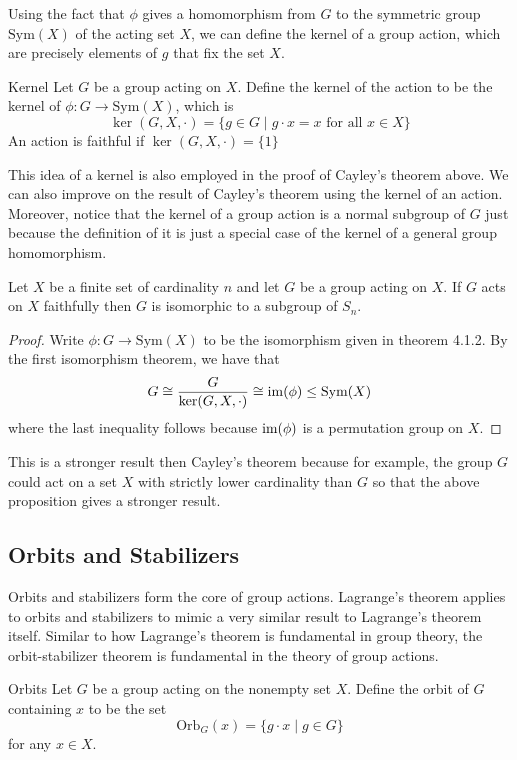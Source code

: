 \documentclass[a4paper]{article}
\begin{document}
Using the fact that $\phi$ gives a homomorphism from $G$ to the symmetric group $\text{Sym}(X)$ of the acting set $X$, we can define the kernel of a group action, which are precisely elements of $g$ that fix the set $X$. 

\begin{defn}{Kernel}{} Let $G$ be a group acting on $X$. Define the kernel of the action to be the kernel of $\phi:G\to\text{Sym}(X)$, which is $$\ker(G,X,\cdot)=\{g\in G\;|\;g\cdot x=x\text{ for all }x\in X\}$$ An action is faithful if $\ker(G,X,\cdot)=\{1\}$
\end{defn}

This idea of a kernel is also employed in the proof of Cayley's theorem above. We can also improve on the result of Cayley's theorem using the kernel of an action. Moreover, notice that the kernel of a group action is a normal subgroup of $G$ just because the definition of it is just a special case of the kernel of a general group homomorphism. 

\begin{prp}{}{} Let $X$ be a finite set of cardinality $n$ and let $G$ be a group acting on $X$. If $G$ acts on $X$ faithfully then $G$ is isomorphic to a subgroup of $S_n$. \tcbline
\begin{proof}
Write $\phi:G\to\text{Sym}(X)$ to be the isomorphism given in theorem 4.1.2. By the first isomorphism theorem, we have that $$G\cong\frac{G}{\ker(G,X,\cdot)}\cong\operatorname{im}(\phi)\leq\text{Sym}(X)$$ where the last inequality follows because $\operatorname{im}(\phi)$ is a permutation group on $X$. 
\end{proof}
\end{prp}

This is a stronger result then Cayley's theorem because for example, the group $G$ could act on a set $X$ with strictly lower cardinality than $G$ so that the above proposition gives a stronger result. 

\subsection{Orbits and Stabilizers}
Orbits and stabilizers form the core of group actions. Lagrange's theorem applies to orbits and stabilizers to mimic a very similar result to Lagrange's theorem itself. Similar to how Lagrange's theorem is fundamental in group theory, the orbit-stabilizer theorem is fundamental in the theory of group actions. 

\begin{defn}{Orbits}{} Let $G$ be a group acting on the nonempty set $X$. Define the orbit of $G$ containing $x$ to be the set $$\text{Orb}_G(x)=\{g\cdot x\;|\; g\in G\}$$ for any $x\in X$. 
\end{defn}
\end{document}
